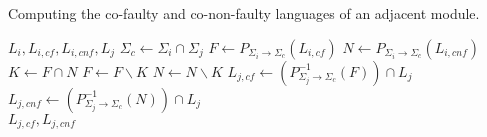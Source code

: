 \documentclass[a4paper, 10pt, conference]{ieeeconf}
\begin{document}



% 
% 
% 


\begin{algorithm} Computing the co-faulty and co-non-faulty languages of an
adjacent module.
\label{alg:partial_co_faulty}
\begin{algorithmic}[1]
	\Require $L_i, L_{i,cf}, L_{i,cnf}, L_j$
	\State $\Sigma_c \leftarrow \Sigma_i \cap \Sigma_j$ 
		\label{alg:pcf_get_common}
	\State $F \leftarrow P_{\Sigma_i \rightarrow \Sigma_c}(L_{i,cf})$
		\label{alg:pcf_get_common_f}
	\State $N \leftarrow P_{\Sigma_i \rightarrow \Sigma_c}(L_{i,cnf})$
		\label{alg:pcf_get_common_n}
	\State $K \leftarrow F \cap N$
		\label{alg:pcf_get_fn}
	\State $F \leftarrow F\backslash K$
		\label{alg:pcf_get_f}
	\State $N \leftarrow N\backslash K$
		\label{alg:pcf_get_n}
	\State $L_{j,cf} \leftarrow 
		(P_{\Sigma_j \rightarrow \Sigma_c}^{-1}(F)) \cap L_j$
		\label{alg:pcf_get_cf}
	\State $L_{j,cnf} \leftarrow 
		(P_{\Sigma_j \rightarrow \Sigma_c}^{-1}(N)) \cap L_j$
		\label{alg:pcf_get_cnf}
	\\
	\Return $L_{j,cf}, L_{j,cnf}$
\end{algorithmic}
\end{algorithm}
\end{document}
